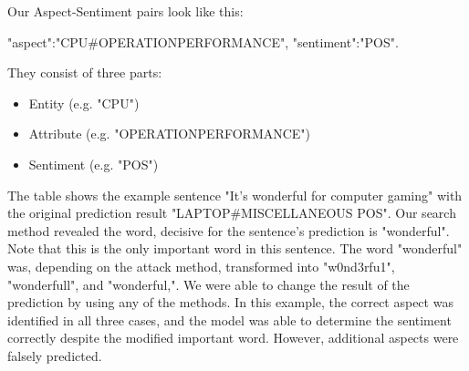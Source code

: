 Our Aspect-Sentiment pairs look like this:


"aspect":"CPU\#OPERATION\textunderscore PERFORMANCE", "sentiment":"POS".



They consist of three parts:
\begin{itemize}
\item Entity (e.g. "CPU")
\item Attribute (e.g. "OPERATION\textunderscore PERFORMANCE")
\item Sentiment (e.g. "POS")
\end{itemize}

The table shows the example sentence "It's wonderful for computer gaming" with the original prediction result "LAPTOP\#MISCELLANEOUS POS". Our search method revealed the word, decisive for the sentence's prediction is "wonderful". Note that this is the only important word in this sentence. The word "wonderful" was, depending on the attack method, transformed into "w0nd3rfu1", "wonderfull", and "wonderful,". We were able to change the result of the prediction by using any of the methods. In this example, the correct aspect was identified in all three cases, and the model was able to determine the sentiment correctly despite the modified important word. However, additional aspects were falsely predicted. 


